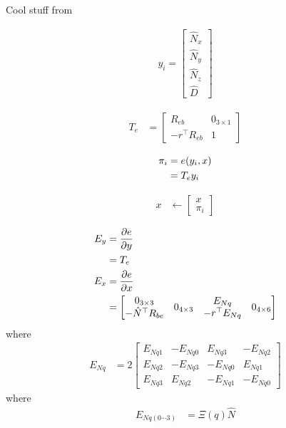 \documentclass[]{article}
\begin{document}
{Cool stuff from \cite{Sola2013}

\begin{align}
	y_i = 
	\left[
	\begin{matrix}
		\hat{N}_x \\
		\hat{N}_y \\
		\hat{N}_z \\
		\hat{D}
	\end{matrix}
	\right]
\end{align}

\begin{align}
	T_e &= 
	\left[
	\begin{matrix}
		R_{eb} 			& 0_{3\times1} \\
		-r^\top R_{eb}	& 1
	\end{matrix}
	\right]
\end{align}

\begin{align}
	\pi_i	&= e(y_i,x) \notag \\
			&= T_e y_i
\end{align}

\begin{align}
	x &\leftarrow
	\left[
	\begin{matrix}
		x \\
		\pi_i
	\end{matrix}
	\right]
\end{align}

\begin{align}
	E_y &= \frac{\partial e}{\partial y} \notag \\
		&= T_e \\
	E_x &= \frac{\partial e}{\partial x} \notag \\
		&=
	\left[
	\begin{matrix}
		\begin{matrix}
			0_{3 \times 3} \\
			-\hat{N}^\top R_{be}
		\end{matrix}
		&
		0_{4 \times 3}
		&
		\begin{matrix}
			E_{Nq} \\
			-r^\top E_{Nq}
		\end{matrix}
		&
		0_{4 \times 6}
	\end{matrix}
	\right]
\end{align}
where
\begin{align}
	E_{Nq} 	&= 2
	\left[
	\begin{matrix}
		E_{Nq1} 	& -E_{Nq0} 	& E_{Nq3} 	& -E_{Nq2} \\
		E_{Nq2} 	& -E_{Nq3} 	& -E_{Nq0} 	& E_{Nq1} \\
		E_{Nq3} 	& E_{Nq2} 	& -E_{Nq1} 	& -E_{Nq0}
	\end{matrix}
	\right]
\end{align}
where
\begin{align}
	E_{Nq(0\cdots3)} &= \Xi(q) \hat{N}
\end{align}

}
\end{document}
